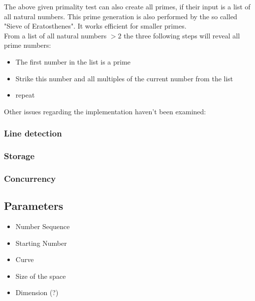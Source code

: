 The above given primality test can also create all primes, if their input is a list of all natural numbers. This prime generation is also performed by the so called "Sieve of Eratosthenes". It works efficient for smaller primes.
\\
From a list of all natural numbers $> 2$ the three following steps will reveal all prime numbers:

\begin{itemize}%
   \item The first number in the list is a prime
   \item Strike this number and all multiples of the current number from the list
   \item repeat  
\end{itemize}%

Other issues regarding the implementation haven't been examined:

\subsubsection{Line detection}
\label{sec:line_detection}

\subsubsection{Storage}
\label{sec:storage}

\subsubsection{Concurrency}
\label{sec:concurrency}

\subsection{Parameters}
\label{sec:Parameters}
\begin{itemize}%
   \item Number Sequence
   \item Starting Number
   \item Curve
   \item Size of the space
   \item Dimension (?)   
\end{itemize}%


